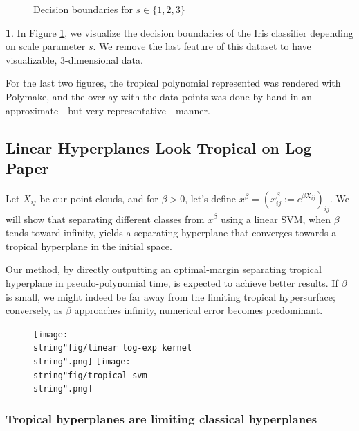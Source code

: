 \documentclass[oneside,english]{amsart}
\numberwithin{equation}{section}
\numberwithin{figure}{section}
\theoremstyle{plain}
\theoremstyle{definition}
\theoremstyle{plain}
\theoremstyle{remark}
\theoremstyle{plain}
\theoremstyle{definition}
\newtheorem{example}[thm]{\protect\examplename}
\theoremstyle{definition}
\providecommand{\examplename}{Example}
\begin{document}
\begin{figure}
    \caption{Decision boundaries for $s\in\{1,2,3\}$}
    \label{fig:decision_boundaries}
\end{figure}

\begin{example}
In Figure \ref{fig:decision_boundaries}, we visualize the decision boundaries of the Iris classifier depending on scale parameter $s$. We remove the last feature of this dataset to have visualizable, 3-dimensional data.

For the last two figures, the tropical polynomial represented was rendered with Polymake, and the overlay with the data points was done by hand in an approximate - but very representative - manner.
\end{example}

\subsection{Linear Hyperplanes Look Tropical on Log Paper}

Let $X_{ij}$ be our point clouds, and for $\beta>0$, let's define
$x^{\beta}=(x_{ij}^{\beta}:=e^{\beta X_{ij}})_{ij}$. We will show
that separating different classes from $x^{\beta}$ using a linear
SVM, when $\beta$ tends toward infinity, yields a separating hyperplane
that converges towards a tropical hyperplane in the initial space.

Our method, by directly outputting an optimal-margin separating tropical
hyperplane in pseudo-polynomial time, is expected to achieve better
results. If $\beta$ is small, we might indeed be far away from the
limiting tropical hypersurface; conversely, as $\beta$ approaches
infinity, numerical error becomes predominant.

\begin{figure}[h]
\centering \texttt{[image: \\string"fig/linear log-exp kernel\\string".png]}
\texttt{[image: \\string"fig/tropical svm\\string".png]} 
\end{figure}


\subsubsection{Tropical hyperplanes are limiting classical hyperplanes}
\end{document}

